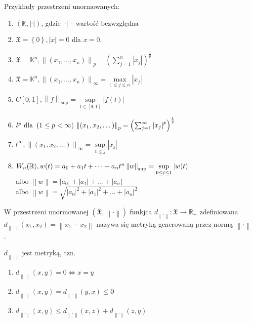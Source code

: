 \begin{prz}
Przykłady przestrzeni unormowanych:
\begin{enumerate}
\item $ \left(\mathbb K,\left|\cdot \right|\right) $, gdzie $ \left|\cdot \right| $ - wartość bezwzględna
\item $ \mathfrak X=\left\{0\right\},\left|x\right| =0$ dla $ x=0 $.
\item $ \mathfrak X=\mathbb K^n, \left\|\left(x_1,\dots,x_n\right)\right\|_p=\left(\sum_{j=1}^{n}\left|x_j\right|\right)^\frac{1}{p} $
\item $ \mathfrak X=\mathbb K^n,\left\|\left(x_1,\dots,x_n\right)\right\|_\infty =\max\limits_{1\le j\le n}\left|x_j\right| $
\item $ C[0,1],\left\|f\right\|_{\sup} =\sup\limits_{t\in[0,1]}\left|f(t)\right|$
\item $ l^p\text{ dla }\left(1\le p<\infty \right)\\
\left\|\left(x_1,x_2,\dots \right)\right\|_p=\left(\sum_{j=1}^{\infty }\left|x_j\right|^p\right)^\frac{1}{p} $
\item $ l^\infty ,\left\|\left(x_1,x_2,\dots \right)\right\|_\infty =\sup\limits_{1\le j}\left|x_j\right| $
\item $ W_n(\mathbb R ),w(t)=a_0+a_1t+\dots+a_nt^n\\
\left\|w\right\|_{\sup}=\sup\limits_{0\le t\le 1}\left|w(t)\right| $\\
albo $ \left\|w\right\|=
\left| a_0\right| + \left| a_1\right| + \dots + \left| a_n\right| $\\
albo $ \left\|w\right\|=\sqrt{\left| a_0\right|^2 + \left| a_1\right|^2 + \dots + \left| a_n\right|^2} $
\end{enumerate}
\end{prz}
\begin{defi}[Metryka]
W przestrzeni unormowanej $ (\mathfrak X,\left\|\cdot \right\|) $ funkjca $ d_{\left\|\cdot \right\|}:\mathfrak X\to \mathbb R _+ $ zdefiniowana $ d_{\left\|\cdot \right\|}(x_1,x_2)=\left\|x_1-x_2\right\| $ nazywa się metryką generowaną przez normą $ \left\|\cdot \right\| $.
\end{defi}
\begin{twr}
$ d_{\left\|\cdot \right\|} $ jest metryką, tzn.
\begin{enumerate}
\item $ d_{\left\|\cdot \right\|}(x,y)=0\Leftrightarrow x=y $
\item $ d_{\left\|\cdot \right\|}(x,y)=d_{\left\|\cdot \right\|}(y,x)\le0 $
\item $ d_{\left\|\cdot \right\|}(x,y)\le d_{\left\|\cdot \right\|}(x,z)+d_{\left\|\cdot \right\|}(z,y) $
\end{enumerate}
\end{twr}\noindent
